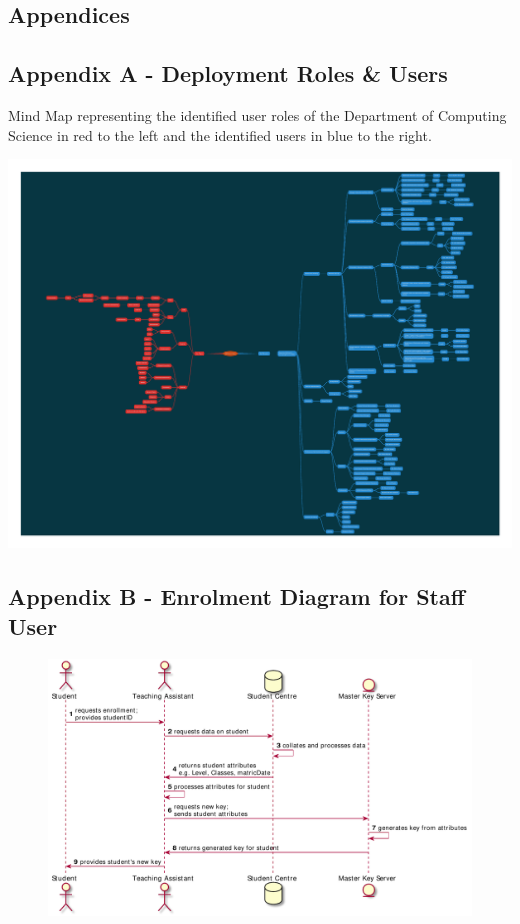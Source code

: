 \begin{appendices}

\chapter{Appendices}

\section{Appendix A - Deployment Roles \& Users}
\label{appendix:roles_users}

Mind Map representing the identified user roles of the Department of Computing Science in red to the left and the identified users in blue to the right.

\includegraphics[width=\linewidth]{appendices/mind_maps/ABE_Users_slides_Oct26.pdf}

\section{Appendix B - Enrolment Diagram for Staff User}
\label{appendix:enrolment_diagram}

\begin{figure}
    \centering
    \includegraphics[width=\linewidth,keepaspectratio]{appendices/diagrams/flow_of_info/enrollment_stu_sequence.pdf}


\end{figure}
\end{appendices}
